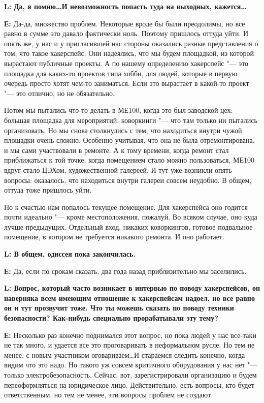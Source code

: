 \documentclass[10pt, a5paper]{article}
\begin{document}
{\noindent \bf L: Да, я помню\ldots И невозможность попасть туда на выходных, кажется\ldots}

{\noindent \bf Е:} Да-да, множество проблем. Некоторые вроде бы были преодолимы, но все равно в сумме это давало фактически ноль. Поэтому пришлось оттуда уйти. И опять же, у нас и у пригласившей нас стороны оказались разные представления о том, что такое хакерспейс. Они надеялись, что мы будем площадкой, из которой вырастают публичные проекты. А по нашему определению хакерспейс "--- это площадка для каких-то проектов типа хобби, для людей, которые в первую очередь просто хотят чем-то заниматься. Если это вырастает в какой-то проект "--- это отлично, но не обязательно. 

Потом мы пытались что-то делать в МЕ100, когда это был заводской цех: большая площадка для мероприятий, коворкинги "--- что там только ни пытались организовать. Но мы снова столкнулись с тем, что находиться внутри чужой площадки очень сложно.  Особенно учитывая, что она не была отремонтирована, и мы сами участвовали в ремонте. А к тому времени, когда ремонт стал приближаться к той точке, когда помещением стало можно пользоваться, МЕ100 вдруг стало ЦЭХом, художественной галереей. И тут уже возникли опять вопросы: оказалось, что находиться внутри галереи совсем неудобно. В общем, оттуда тоже пришлось уйти.

Но к счастью нам попалось текущее помещение. Для хакерспейса оно годится почти идеально "--- кроме местоположения, пожалуй. Во всяком случае, оно куда лучше предыдущих. Отдельный вход, никаких коворкингов, готовое подвальное помещение, в котором не требуется никакого ремонта. И оно работает. 

{\noindent \bf L: В общем, одиссея пока закончилась.}

{\noindent \bf Е:} Да, если по срокам сказать, два года назад приблизительно мы заселились.

{\noindent \bf L: Вопрос, который часто возникает в интервью по поводу хакерспейсов, он наверняка всем имеющим отношение к хакерспейсам надоел, но все равно он и тут прозвучит тоже. Что ты можешь сказать по поводу техники безопасности? Как-нибудь специально прорабатывали эту тему?}

{\noindent \bf Е:} Несколько раз конечно поднимался этот вопрос, но пока людей у нас все-таки не так много, и удается все это проговаривать в неформальном русле.  Но тем не менее, с новым участником оговариваем\ldots И стараемся следить конечно, когда видим что это надо. Но такого уж совсем критичного оборудования у нас нет "--- только электробезопасность. Сейчас, вот, зарегистрировали организацию и будем переоформляться на юридическое лицо. Действительно, есть вопросы, кто будет ответственным, но тем не менее, эти вопросы проблем не создают.
\end{document}
